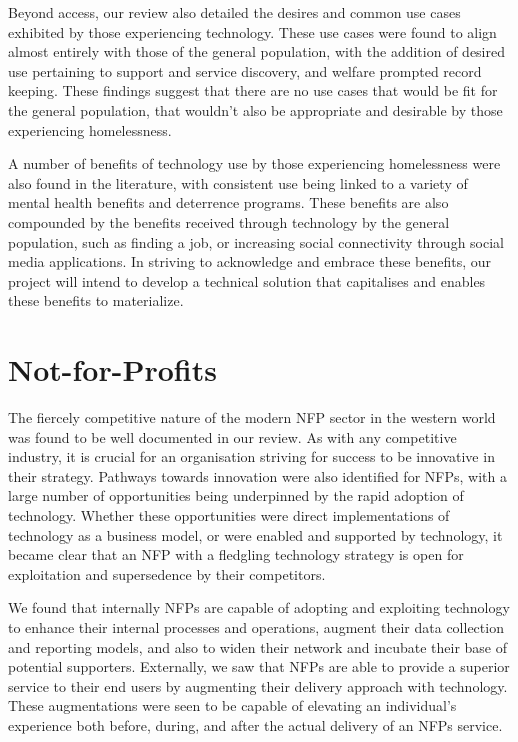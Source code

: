 Beyond access, our review also detailed the desires and common use cases exhibited by those experiencing technology. These use cases were found to align almost entirely with those of the general population, with the addition of desired use pertaining to support and service discovery, and welfare prompted record keeping. These findings suggest that there are no use cases that would be fit for the general population, that wouldn't also be appropriate and desirable by those experiencing homelessness.

A number of benefits of technology use by those experiencing homelessness were also found in the literature, with consistent use being linked to a variety of mental health benefits and deterrence programs. These benefits are also compounded by the benefits received through technology by the general population, such as finding a job, or increasing social connectivity through social media applications. In striving to acknowledge and embrace these benefits, our project will intend to develop a technical solution that capitalises and enables these benefits to materialize.

\section{Not-for-Profits}

The fiercely competitive nature of the modern NFP sector in the western world was found to be well documented in our review. As with any competitive industry, it is crucial for an organisation striving for success to be innovative in their strategy. Pathways towards innovation were also identified for NFPs, with a large number of opportunities being underpinned by the rapid adoption of technology. Whether these opportunities were direct implementations of technology as a business model, or were enabled and supported by technology, it became clear that an NFP with a fledgling technology strategy is open for exploitation and supersedence by their competitors.

We found that internally NFPs are capable of adopting and exploiting technology to enhance their internal processes and operations, augment their data collection and reporting models, and also to widen their network and incubate their base of potential supporters. Externally, we saw that NFPs are able to provide a superior service to their end users by augmenting their delivery approach with technology. These augmentations were seen to be capable of elevating an individual's experience both before, during, and after the actual delivery of an NFPs service.

